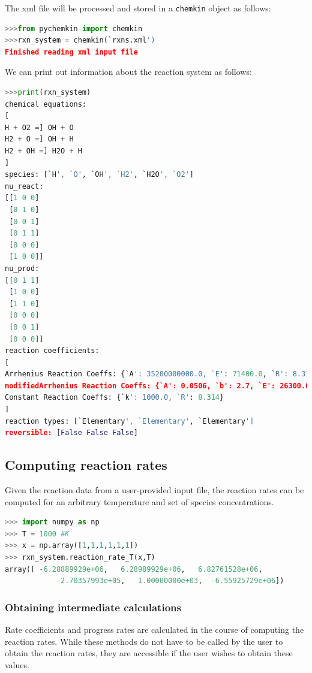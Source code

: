\documentclass[12pt]{article}
\begin{document}
The xml file will be processed and stored in a {\tt chemkin} object as follows:
\begin{lstlisting}[language = Python, basicstyle = \ttfamily, breaklines = True, columns = fullflexible]
>>>from pychemkin import chemkin
>>>rxn_system = chemkin(`rxns.xml')
Finished reading xml input file
\end{lstlisting}

We can print out information about the reaction system as follows:
\begin{lstlisting}[language = Python, basicstyle = \ttfamily,columns = fullflexible, showstringspaces = False]
>>>print(rxn_system)
chemical equations:
[
H + O2 =] OH + O
H2 + O =] OH + H
H2 + OH =] H2O + H
]
species: [`H', `O', `OH', `H2', `H2O', `O2']
nu_react:
[[1 0 0]
 [0 1 0]
 [0 0 1]
 [0 1 1]
 [0 0 0]
 [1 0 0]]
nu_prod:
[[0 1 1]
 [1 0 0]
 [1 1 0]
 [0 0 0]
 [0 0 1]
 [0 0 0]]
reaction coefficients:
[
Arrhenius Reaction Coeffs: {`A': 35200000000.0, `E': 71400.0, `R': 8.314}
modifiedArrhenius Reaction Coeffs: {`A': 0.0506, `b': 2.7, `E': 26300.0, `R': 8.314}
Constant Reaction Coeffs: {`k': 1000.0, `R': 8.314}
]
reaction types: [`Elementary', `Elementary', `Elementary']
reversible: [False False False]
\end{lstlisting}


\subsection{Computing reaction rates}
Given the reaction data from a user-provided input file, the reaction rates can be computed for an arbitrary temperature and set of species concentrations.

\begin{lstlisting}[language = Python, basicstyle = \ttfamily,columns = fullflexible, showstringspaces = False]
>>> import numpy as np
>>> T = 1000 #K
>>> x = np.array([1,1,1,1,1,1])
>>> rxn_system.reaction_rate_T(x,T)
array([ -6.28889929e+06,   6.28989929e+06,   6.82761528e+06,
            -2.70357993e+05,   1.00000000e+03,  -6.55925729e+06])
\end{lstlisting}

\subsubsection{Obtaining intermediate calculations}
Rate coefficients and progress rates are calculated in the course of computing the reaction rates. While these methods do not have to be called by the user to obtain the reaction rates, they are accessible if the user wishes to obtain these values. 
\end{document}
